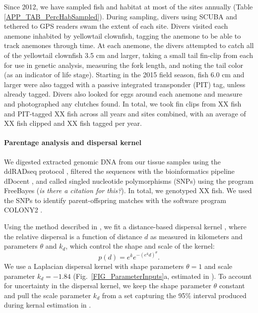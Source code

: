 \documentclass[12pt, oneside]{article}   	%
\begin{document}
Since 2012, we have sampled fish and habitat at most of the sites annually (Table \ref{APP_TAB_PercHabSampled}). During sampling, divers using SCUBA and tethered to GPS readers swam the extent of each site. Divers visited each anemone inhabited by yellowtail clownfish, tagging the anemone to be able to track anemones through time. At each anemone, the divers attempted to catch all of the yellowtail clownfish 3.5 cm and larger, taking a small tail fin-clip from each for use in genetic analysis, measuring the fork length, and noting the tail color (as an indicator of life stage). Starting in the 2015 field season, fish 6.0 cm and larger were also tagged with a passive integrated transponder (PIT) tag, unless already tagged. Divers also looked for eggs around each anemone and measure and photographed any clutches found. In total, we took fin clips from XX fish and PIT-tagged XX fish across all years and sites combined, with an average of XX fish clipped and XX fish tagged per year.

\paragraph*{Parentage analysis and dispersal kernel}  %

We digested extracted genomic DNA from our tissue samples using the ddRADseq protocol \citep{peterson2012double}, filtered the sequences with the bioinformatics pipeline dDocent \citep{puritz2014ddocent}, and called singled nucleotide polymorphisms (SNPs) using the program FreeBayes (\textit{is there a citation for this?}). In total, we genotyped XX fish. We used the SNPs to identify parent-offspring matches with the software program COLONY2 \citep{wang2012computationally} \citep[details on genotyping and parentage analysis in][]{catalanoInPrepconnectivity}.

Using the method described in \citep{bode2018estimating}, we fit a distance-based dispersal kernel \citep{catalanoInPrepconnectivity}, where the relative dispersal is a function of distance $d$ as measured in kilometers and parameters $\theta$ and $k_d$, which control the shape and scale of the kernel:
\begin{equation}
p(d) = e^k e^{-(e^k d)^\theta}. \label{EQN_DispKernel}
\end{equation}
We use a Laplacian dispersal kernel with shape parameters $\theta = 1$ and scale parameter $k_d = -1.84$ (Fig.\ \ref{FIG_ParameterInputs}a, estimated in \citep{catalanoInPrepconnectivity}). To account for uncertainty in the dispersal kernel, we keep the shape parameter $\theta$ constant and pull the scale parameter $k_d$ from a set capturing the 95\% interval produced during kernal estimation in \cite{catalanoInPrepconnectivity}.
\end{document}

